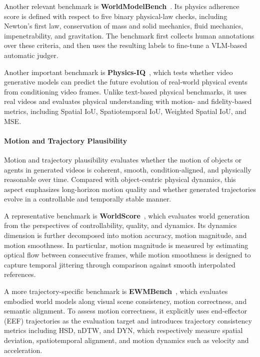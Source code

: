Another relevant benchmark is \textbf{WorldModelBench}~\citep{li2025worldmodelbench}. Its physics adherence score is defined with respect to five binary physical-law checks, including Newton’s first law, conservation of mass and solid mechanics, fluid mechanics, impenetrability, and gravitation. The benchmark first collects human annotations over these criteria, and then uses the resulting labels to fine-tune a VLM-based automatic judger.

Another important benchmark is \textbf{Physics-IQ}~\citep{motamed2026physicsiq}, which tests whether video generative models can predict the future evolution of real-world physical events from conditioning video frames. Unlike text-based physical benchmarks, it uses real videos and evaluates physical understanding with motion- and fidelity-based metrics, including Spatial IoU, Spatiotemporal IoU, Weighted Spatial IoU, and MSE.

\paragraph{Motion and Trajectory Plausibility}
Motion and trajectory plausibility evaluates whether the motion of objects or agents in generated videos is coherent, smooth, condition-aligned, and physically reasonable over time. Compared with object-centric physical dynamics, this aspect emphasizes long-horizon motion quality and whether generated trajectories evolve in a controllable and temporally stable manner.

A representative benchmark is \textbf{WorldScore}~\citep{duan2025worldscoreunifiedevaluationbenchmark}, which evaluates world generation from the perspectives of controllability, quality, and dynamics. Its dynamics dimension is further decomposed into motion accuracy, motion magnitude, and motion smoothness. In particular, motion magnitude is measured by estimating optical flow between consecutive frames, while motion smoothness is designed to capture temporal jittering through comparison against smooth interpolated references. 

A more trajectory-specific benchmark is \textbf{EWMBench}~\citep{yue2025ewmbench}, which evaluates embodied world models along visual scene consistency, motion correctness, and semantic alignment. To assess motion correctness, it explicitly uses end-effector (EEF) trajectories as the evaluation target and introduces trajectory consistency metrics including HSD, nDTW, and DYN, which respectively measure spatial deviation, spatiotemporal alignment, and motion dynamics such as velocity and acceleration.



